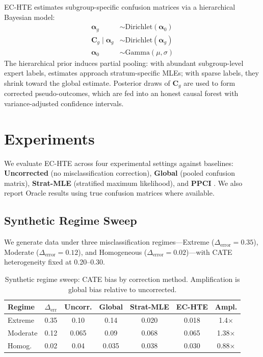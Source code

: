 \documentclass[11pt,a4paper]{article}
\begin{document}
EC-HTE estimates subgroup-specific confusion matrices via a hierarchical Bayesian model:
\begin{align}
    \boldsymbol{\alpha}_g &\sim \text{Dirichlet}(\boldsymbol{\alpha}_0) \\
    \mathbf{C}_g \mid \boldsymbol{\alpha}_g &\sim \text{Dirichlet}(\boldsymbol{\alpha}_g) \\
    \boldsymbol{\alpha}_0 &\sim \text{Gamma}(\mu, \sigma)
\end{align}
The hierarchical prior induces partial pooling: with abundant subgroup-level expert labels, estimates approach stratum-specific MLEs; with sparse labels, they shrink toward the global estimate. Posterior draws of $\mathbf{C}_g$ are used to form corrected pseudo-outcomes, which are fed into an honest causal forest \citep{athey2019generalized} with variance-adjusted confidence intervals.

\section{Experiments}

We evaluate EC-HTE across four experimental settings against baselines: \textbf{Uncorrected} (no misclassification correction), \textbf{Global} (pooled confusion matrix), \textbf{Strat-MLE} (stratified maximum likelihood), and \textbf{PPCI} \citep{sui2026ppci}. We also report Oracle results using true confusion matrices where available.

\subsection{Synthetic Regime Sweep}
\label{sec:synthetic}

We generate data under three misclassification regimes---Extreme ($\Delta_{\text{error}} = 0.35$), Moderate ($\Delta_{\text{error}} = 0.12$), and Homogeneous ($\Delta_{\text{error}} = 0.02$)---with CATE heterogeneity fixed at 0.20--0.30.

\begin{table}[t]
\centering
\small
\caption{Synthetic regime sweep: CATE bias by correction method. Amplification is global bias relative to uncorrected.}
\label{tab:regime}
\begin{tabular}{@{}lcccccc@{}}
\toprule
Regime & $\Delta_{\text{err}}$ & Uncorr. & Global & Strat-MLE & EC-HTE & Ampl. \\
\midrule
Extreme & 0.35 & 0.10 & 0.14 & 0.020 & 0.018 & 1.4$\times$ \\
Moderate & 0.12 & 0.065 & 0.09 & 0.068 & 0.065 & 1.38$\times$ \\
Homog. & 0.02 & 0.04 & 0.035 & 0.038 & 0.030 & 0.88$\times$ \\
\bottomrule
\end{tabular}
\end{table}
\end{document}
